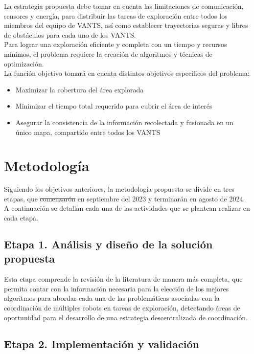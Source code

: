 \documentclass[sigconf]{acmart}
\providecommand{\DIFadd}[1]{{\protect\color{blue}\uwave{#1}}} %
\providecommand{\DIFdel}[1]{{\protect\color{red}\sout{#1}}}                      %
\providecommand{\DIFaddbegin}{} %
\providecommand{\DIFaddend}{} %
\providecommand{\DIFdelbegin}{} %
\providecommand{\DIFdelend}{} %
\begin{document}
La estrategia propuesta debe tomar en cuenta las limitaciones de comunicación, sensores y energía, para distribuir las tareas de exploración entre todos los miembros del equipo de VANTS, así como establecer trayectorias seguras y libres de obstáculos para cada uno de los VANTS.\\

Para lograr una exploraci\'{o}n eficiente y completa con un tiempo y recursos m\'{i}nimos, el problema requiere la creaci\'{o}n de algoritmos y t\'{e}cnicas de optimizaci\'{o}n.\\

La funci\'{o}n objetivo tomar\'{a} en cuenta distintos objetivos espec\'{i}ficos del problema:
\begin{itemize}
\item Maximizar la cobertura del \'{a}rea explorada 
\item Minimizar el tiempo total requerido para cubrir el \'{a}rea de inter\'{e}s
\item Asegurar la consistencia de la información recolectada y fusionada en un único mapa, compartido entre todos los VANTS
\end{itemize}

\section{Metodología}

Siguiendo los objetivos anteriores, la metodolog\'{i}a propuesta se divide en tres etapas, que \DIFdelbegin \DIFdel{comenzarón }\DIFdelend \DIFaddbegin \DIFadd{comenzaron }\DIFaddend en septiembre del 2023 y terminarán en agosto de 2024. A continuaci\'{o}n se detallan cada una de las actividades que se plantean realizar en cada etapa.

\subsection*{Etapa 1. An\'{a}lisis y dise\~{n}o de la soluci\'{o}n propuesta}

Esta etapa comprende la revisi\'{o}n de la literatura de manera m\'{a}s completa, que permita contar con la informaci\'{o}n necesaria para la elecci\'{o}n de los mejores algoritmos para abordar cada una de las problem\'{a}ticas asociadas con la coordinaci\'{o}n de múltiples robots en tareas de exploración, detectando áreas de oportunidad para el desarrollo de una estrategia descentralizada de coordinación. 

\subsection*{Etapa 2. Implementaci\'{o}n y validaci\'{o}n}
\end{document}
